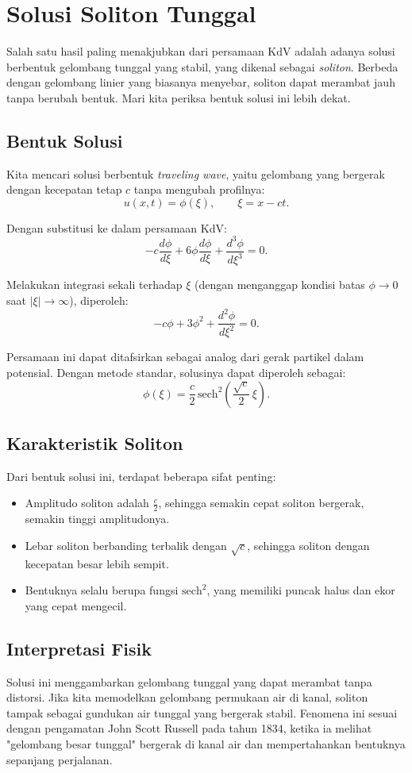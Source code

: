 \documentclass{bukumjh}
\begin{document}
\section{Solusi Soliton Tunggal}

Salah satu hasil paling menakjubkan dari persamaan KdV adalah adanya solusi berbentuk gelombang tunggal yang stabil, yang dikenal sebagai \emph{soliton}. 
Berbeda dengan gelombang linier yang biasanya menyebar, soliton dapat merambat jauh tanpa berubah bentuk. 
Mari kita periksa bentuk solusi ini lebih dekat.

\subsection*{Bentuk Solusi}
Kita mencari solusi berbentuk \emph{traveling wave}, yaitu gelombang yang bergerak dengan kecepatan tetap $c$ tanpa mengubah profilnya:
\[
u(x,t) = \phi(\xi), \qquad \xi = x - ct.
\]

Dengan substitusi ke dalam persamaan KdV:
\[
-c \frac{d\phi}{d\xi} + 6 \phi \frac{d\phi}{d\xi} + \frac{d^3 \phi}{d\xi^3} = 0.
\]

Melakukan integrasi sekali terhadap $\xi$ (dengan menganggap kondisi batas $\phi \to 0$ saat $|\xi| \to \infty$), diperoleh:
\[
-c \phi + 3 \phi^2 + \frac{d^2 \phi}{d\xi^2} = 0.
\]

Persamaan ini dapat ditafsirkan sebagai analog dari gerak partikel dalam potensial. 
Dengan metode standar, solusinya dapat diperoleh sebagai:
\[
\phi(\xi) = \frac{c}{2} \, \text{sech}^2\!\left( \frac{\sqrt{c}}{2} \, \xi \right).
\]

\subsection*{Karakteristik Soliton}
Dari bentuk solusi ini, terdapat beberapa sifat penting:
\begin{itemize}
  \item Amplitudo soliton adalah $\frac{c}{2}$, sehingga semakin cepat soliton bergerak, semakin tinggi amplitudonya.
  \item Lebar soliton berbanding terbalik dengan $\sqrt{c}$, sehingga soliton dengan kecepatan besar lebih sempit.
  \item Bentuknya selalu berupa fungsi $\text{sech}^2$, yang memiliki puncak halus dan ekor yang cepat mengecil.
\end{itemize}

\subsection*{Interpretasi Fisik}
Solusi ini menggambarkan gelombang tunggal yang dapat merambat tanpa distorsi. 
Jika kita memodelkan gelombang permukaan air di kanal, soliton tampak sebagai gundukan air tunggal yang bergerak stabil. 
Fenomena ini sesuai dengan pengamatan John Scott Russell pada tahun 1834, ketika ia melihat "gelombang besar tunggal" bergerak di kanal air dan mempertahankan bentuknya sepanjang perjalanan.
\end{document}
